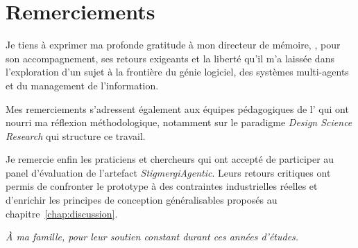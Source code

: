 \chapter*{Remerciements}


Je tiens \`a exprimer ma profonde gratitude \`a mon directeur de m\'emoire,
\memoireDirecteur, pour son accompagnement, ses retours exigeants et la
libert\'e qu'il m'a laiss\'ee dans l'exploration d'un sujet \`a la fronti\`ere du g\'enie
logiciel, des syst\`emes multi-agents et du management de l'information.

Mes remerciements s'adressent \'egalement aux \'equipes p\'edagogiques de l'\memoireEcole{}
qui ont nourri ma r\'eflexion m\'ethodologique, notamment sur le paradigme \emph{Design
Science Research} qui structure ce travail.

Je remercie enfin les praticiens et chercheurs qui ont accept\'e de participer au
panel d'\'evaluation de l'artefact \emph{StigmergiAgentic}. Leurs retours critiques
ont permis de confronter le prototype \`a des contraintes industrielles r\'eelles
et d'enrichir les principes de conception g\'en\'eralisables propos\'es au
chapitre~\ref{chap:discussion}.

\vspace{1cm}
\noindent \textit{\`A ma famille, pour leur soutien constant durant ces ann\'ees d'\'etudes.}

\cleardoublepage
